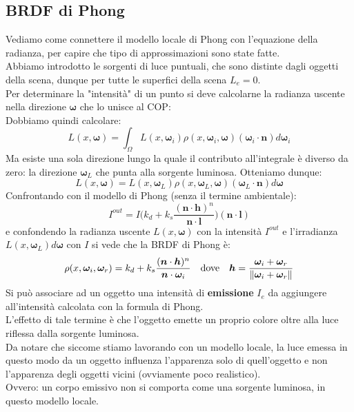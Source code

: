 \documentclass[a4paper, 10pt]{article}
\renewcommand{\vec}{\bm}
\begin{document}
	\subsection{BRDF di Phong}
		Vediamo come connettere il modello locale di Phong con
		l’equazione della radianza, per capire che tipo di
		approssimazioni sono state fatte.\\
		Abbiamo introdotto le sorgenti di luce puntuali, che sono
		distinte dagli oggetti della scena, dunque per tutte le superfici
		della scena $ L_e = 0 $.\\
		Per determinare la "intensità" di un punto si deve calcolarne la
		radianza uscente nella direzione $ \vec{\omega} $ che lo unisce al COP:\\
		Dobbiamo quindi calcolare:
		\[
			L(x, \vec{\omega}) = \int_{\Omega}  L(x, \vec{\omega}_i) 
			\rho(x, \vec{\omega}_i, \vec{\omega}) (\vec{\omega}_i\cdot\vec{n}) d\vec{\omega}_i
		\]
		Ma esiste una sola direzione lungo la quale il contributo
		all’integrale è diverso da zero: la direzione $ \vec{\omega}_L $ che punta alla
		sorgente luminosa. Otteniamo dunque:
		\[
			L(x, \vec{\omega}) = L(x, \vec{\omega}_L) \rho(x, \vec{\omega}_L, \vec{\omega})
			(\vec{\omega}_L\cdot\vec{n}) d\vec{\omega}
		\]
		Confrontando con il modello di Phong (senza il termine
		ambientale):
		\[
			I^{out} = I \Big( k_d + k_s\dfrac{(\vec{n}\cdot\vec{h})^n}{\vec{n}\cdot\vec{l}}\Big)
			(\vec{n}\cdot\vec{l})
		\]
		e confondendo la radianza uscente $ L(x, \vec{\omega}) $ con la intensità
		$ I^{out} $ e l'irradianza $ L(x, \vec{\omega}_L )d\vec{\omega} $ con $ I $ si vede che la BRDF di Phong è:
		\[
			\rho(x, \vec{\omega}_i, \vec{\omega}_r) =
			k_d + k_s\dfrac{(\vec{n}\cdot\vec{h})^n}{\vec{n}\cdot\vec{\omega}_i} \quad
			\textup{dove} \quad
			\vec{h} = \dfrac{\vec{\omega}_i + \vec{\omega}_r}{\|\vec{\omega}_i + \vec{\omega}_r\|}
		\]
		Si può associare ad un oggetto una intensità di \textbf{emissione} $ I_e $
		da aggiungere all’intensità calcolata con la formula di Phong.\\
		L’effetto di tale termine è che l’oggetto emette un proprio
		colore oltre alla luce riflessa dalla sorgente luminosa.\\
		Da notare che siccome stiamo lavorando con un modello locale, la luce emessa in questo modo da un oggetto influenza l’apparenza solo di quell’oggetto e non l’apparenza
		degli oggetti vicini (ovviamente poco realistico).\\
		Ovvero: un corpo emissivo non si comporta come una sorgente luminosa, in questo modello locale.
		
\end{document}
